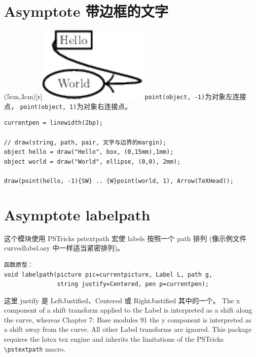 \documentclass[a4paper,11pt]{article}
\begin{document}
\section{Asymptote 带边框的文字}
\parpic(5cm,3cm)[r]{\includegraphics{./figs/string_label.pdf}}
\verb+point(object, -1)+为对象左连接点，
\verb+point(object, 1)+为对象右连接点。
\begin{Verbatim}
currentpen = linewidth(2bp);

// draw(string, path, pair, 文字与边界的margin);
object hello = draw("Hello", box, (0,15mm),1mm);
object world = draw("World", ellipse, (0,0), 2mm);

draw(point(hello, -1){SW} .. {W}point(world, 1), Arrow(TeXHead));
\end{Verbatim}

\section{Asymptote labelpath}
这个模块使用 PSTricks pstextpath 宏使 labels 按照一个 path 排列%
(像示例文件 curvedlabel.asy 中一样适当紧密排列)。

\begin{Verbatim}
函数原型：
void labelpath(picture pic=currentpicture, Label L, path g,
               string justify=Centered, pen p=currentpen);
\end{Verbatim}

这里 justify 是 LeftJustified、Centered 或 RightJustified 其中的一个。
The x component of a shift transform applied to the Label is
interpreted as a shift along the curve, whereas Chapter 7: Base
modules 91 the y component is interpreted as a shift away from the curve.
All other Label transforms are ignored. This package requires
the latex tex engine and inherits the limitations of the
PSTricks \verb+\pstextpath+ macro.
\end{document}
